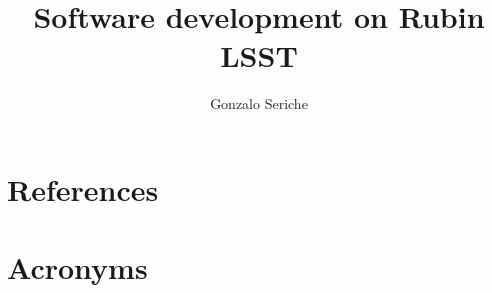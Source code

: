 \documentclass[PMO,lsstdraft,authoryear,toc]{lsstdoc}
\title{Software development on Rubin LSST}
\author{%
Gonzalo Seriche
}
\date{\vcsDate}
\begin{document}
\maketitle


\appendix
\section{References} \label{sec:bib}
\renewcommand{\refname}{} %


\section{Acronyms} \label{sec:acronyms}

\end{document}

